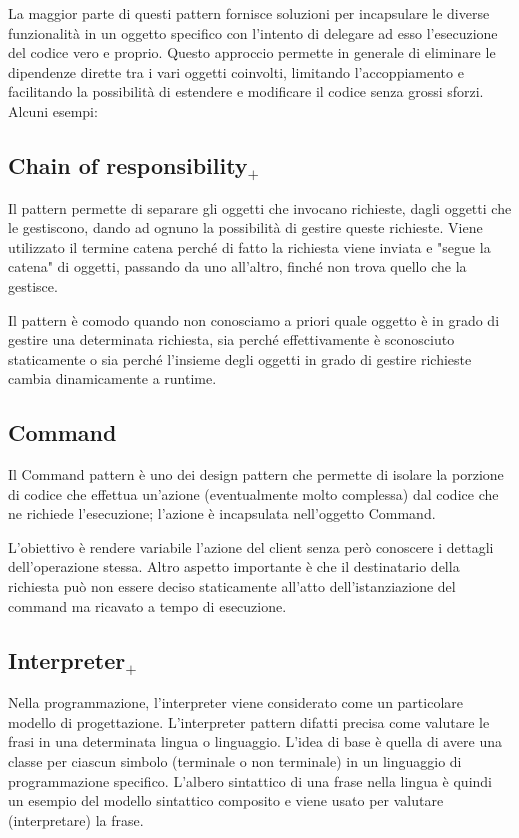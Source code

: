 La maggior parte di questi pattern fornisce soluzioni per incapsulare le diverse funzionalità in un oggetto specifico con l'intento di delegare ad esso l'esecuzione del codice vero e proprio. Questo approccio permette in generale di eliminare le dipendenze dirette tra i vari oggetti coinvolti, limitando l'accoppiamento e facilitando la possibilità di estendere e modificare il codice senza grossi sforzi.
Alcuni esempi:

\subsection{Chain of responsibility$_+$}
Il pattern permette di separare gli oggetti che invocano richieste, dagli oggetti che le gestiscono, dando ad ognuno la possibilità di gestire queste richieste. Viene utilizzato il termine catena perché di fatto la richiesta viene inviata e "segue la catena" di oggetti, passando da uno all'altro, finché non trova quello che la gestisce.

Il pattern è comodo quando non conosciamo a priori quale oggetto è in grado di gestire una determinata richiesta, sia perché effettivamente è sconosciuto staticamente o sia perché l'insieme degli oggetti in grado di gestire richieste cambia dinamicamente a runtime.

\subsection{Command}
Il Command pattern è uno dei design pattern che permette di isolare la porzione di codice che effettua un'azione (eventualmente molto complessa) dal codice che ne richiede l'esecuzione; l'azione è incapsulata nell'oggetto Command.

L'obiettivo è rendere variabile l'azione del client senza però conoscere i dettagli dell'operazione stessa. Altro aspetto importante è che il destinatario della richiesta può non essere deciso staticamente all'atto dell'istanziazione del command ma ricavato a tempo di esecuzione.

\subsection{Interpreter$_+$}
Nella programmazione, l'interpreter viene considerato come un particolare modello di progettazione. L'interpreter pattern difatti precisa come valutare le frasi in una determinata lingua o linguaggio. L'idea di base è quella di avere una classe per ciascun simbolo (terminale o non terminale) in un linguaggio di programmazione specifico. L'albero sintattico di una frase nella lingua è quindi un esempio del modello sintattico composito e viene usato per valutare (interpretare) la frase.

